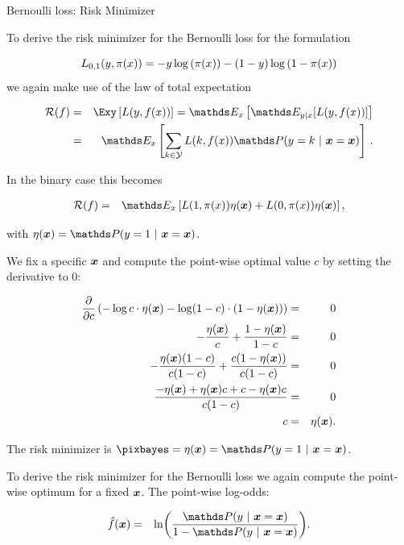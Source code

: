 \begin{vbframe}{Bernoulli loss: Risk Minimizer}

To derive the risk minimizer for the Bernoulli loss for the formulation 

$$
  L_{0,1}(y, \pi(x)) = - y \log \left(\pi(x)\right) - (1 - y) \log \left(1 - \pi(x)\right)
$$
we again make use of the law of total expectation

\begin{eqnarray*}
  \riskf  & = & \Exy\left[\Lxy\right] = \E_x \left[ \E_{y|x} [ L(y, \fx) ] \right] \\
          & = & \E_x \left[\sum_{k \in \Yspace} L(k, \fx) \P(y = k~|~ \xv = \xv)\right]\,. 
\end{eqnarray*}

In the binary case this becomes 

\begin{eqnarray*}
  \riskf &=& \E_x \left[L(1, \pix) \eta(\xv) + L(0, \pix) \eta(\xv) \right],
\end{eqnarray*}

with $\eta(\xv) = \P(y = 1 ~|~ \xv = \xv)$. 

\framebreak 

We fix a specific $\bm{x}$ and compute the point-wise optimal value $c$ by setting the derivative to $0$: 

\begin{eqnarray*}
  \frac{\partial }{\partial c} \left(- \log c  \cdot \eta(\bm{x})- \log (1 - c) \cdot (1 - \eta(\bm{x}))\right) &=& 0 \\
  - \frac{\eta(\bm{x})}{c} + \frac{1 - \eta(\bm{x})}{1 - c} &=& 0 \\
  - \frac{\eta(\bm{x}) (1 - c)}{c (1 - c)} + \frac{c(1 - \eta(\bm{x}))}{c(1 - c)} &=& 0 \\
  \frac{- \eta(\bm{x}) + \eta(\bm{x}) c + c - \eta(\bm{x}) c}{c (1 - c)} &=& 0 \\
  c &=& \eta(\bm{x}). 
\end{eqnarray*}

The risk minimizer is $\pixbayes = \eta(\xv) = \P(y = 1 ~|~ \xv = \xv)$. 

\framebreak 


To derive the risk minimizer for the Bernoulli loss we again compute the point-wise optimum for a fixed $\bm{x}$. The point-wise log-odds:

\begin{eqnarray*}
\fh(\xv) &=&  \ln \biggl(\frac{\P(y~|~\xv = \xv)}{1-\P(y~|~\xv = \xv)}\biggr).
\end{eqnarray*}


\end{vbframe}
